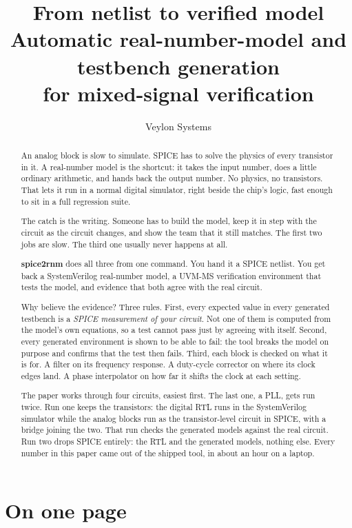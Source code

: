\documentclass[11pt,a4paper]{article}
\title{\vspace{-2em}
  {\color{accent}\Huge From netlist to verified model}\\[0.4em]
  {\large Automatic real-number-model and testbench generation\\
   for mixed-signal verification}}
\author{\normalsize Veylon Systems}
\date{}
\begin{document}
\maketitle
\thispagestyle{fancy}
\vspace{-3em}

\begin{abstract}
\noindent
An analog block is slow to simulate. SPICE has to solve the physics
of every transistor in it. A real-number model is the shortcut: it
takes the input number, does a little ordinary arithmetic, and hands
back the output number. No physics, no transistors. That lets it run in
a normal digital simulator, right beside the chip's logic, fast enough
to sit in a full regression suite.

The catch is the writing. Someone has to build the model, keep it in
step with the circuit as the circuit changes, and show the team that it
still matches. The first two jobs are slow. The third one usually never
happens at all.

\textbf{spice2rnm} does all three from one command. You hand it a SPICE
netlist. You get back a SystemVerilog real-number model, a UVM-MS
verification environment that tests the model, and evidence that both
agree with the real circuit.

Why believe the evidence? Three rules. First, every expected value in
every generated testbench is a \emph{SPICE measurement of your
circuit}. Not one of them is computed from the model's own equations,
so a test cannot pass just by agreeing with itself. Second, every
generated environment is shown to be able to fail: the tool breaks the
model on purpose and confirms that the test then fails. Third, each
block is checked on what it is for. A filter on its frequency
response. A duty-cycle corrector on where its clock edges land. A
phase interpolator on how far it shifts the clock at each setting.

The paper works through four circuits, easiest first. The last one, a
PLL, gets run twice. Run one keeps the transistors: the digital RTL
runs in the SystemVerilog simulator while the analog blocks run as the
transistor-level circuit in SPICE, with a bridge joining the two. That
run checks the generated models against the real circuit. Run two
drops SPICE entirely: the RTL and the generated models, nothing else.
Every number in this paper came out of the shipped tool, in about an
hour on a laptop.
\end{abstract}

\newpage
\section*{On one page}
\end{document}
